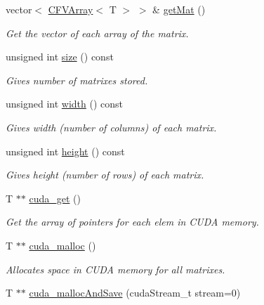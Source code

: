 \begin{DoxyCompactItemize}
vector$<$ \hyperlink{classFVL_1_1CFVArray}{CFVArray}$<$ T $>$ $>$ \& \hyperlink{classFVL_1_1CFVMat_a434d97b662d1620513d0f27ecd0e9b1e}{getMat} ()
\begin{DoxyCompactList}\small\item\em Get the vector of each array of the matrix. \item\end{DoxyCompactList}\item 
unsigned int \hyperlink{classFVL_1_1CFVMat_a90ca964ebcc1b02bbcde225edd49e812}{size} () const 
\begin{DoxyCompactList}\small\item\em Gives number of matrixes stored. \item\end{DoxyCompactList}\item 
unsigned int \hyperlink{classFVL_1_1CFVMat_a7b736ec9a05be5c498760d35a0406ed3}{width} () const 
\begin{DoxyCompactList}\small\item\em Gives width (number of columns) of each matrix. \item\end{DoxyCompactList}\item 
unsigned int \hyperlink{classFVL_1_1CFVMat_aa420a28166e708e3f8b9ecc8e527fc09}{height} () const 
\begin{DoxyCompactList}\small\item\em Gives height (number of rows) of each matrix. \item\end{DoxyCompactList}\item 
T $\ast$$\ast$ \hyperlink{classFVL_1_1CFVMat_a8b296b3ae7f031dac8aecc13b0bf39fc}{cuda\_\-get} ()
\begin{DoxyCompactList}\small\item\em Get the array of pointers for each elem in CUDA memory. \item\end{DoxyCompactList}\item 
T $\ast$$\ast$ \hyperlink{classFVL_1_1CFVMat_a09eadb0032c2862e02ddaf42732533f0}{cuda\_\-malloc} ()
\begin{DoxyCompactList}\small\item\em Allocates space in CUDA memory for all matrixes. \item\end{DoxyCompactList}\item 
T $\ast$$\ast$ \hyperlink{classFVL_1_1CFVMat_add6329cf5dda5b5bf602d724d6d69abc}{cuda\_\-mallocAndSave} (cudaStream\_\-t stream=0)
$$
\end{DoxyCompactItemize}
